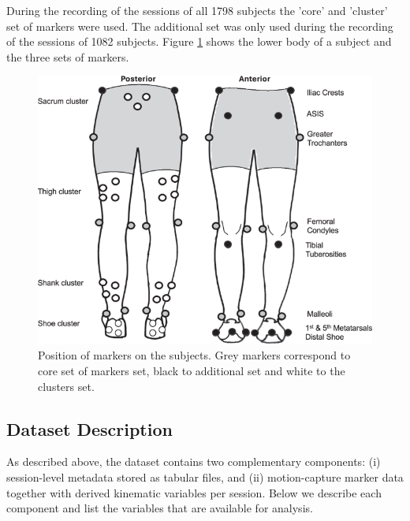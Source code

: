 During the recording of the sessions of all 1798 subjects the 'core' and 'cluster' set of markers were used. The additional set was only used during the recording of the sessions of 1082 subjects. Figure \ref{fig:marker_position} shows the lower body of a subject and the three sets of markers.

\begin{figure}[ht]
    \begin{centering}
    \includegraphics[width=0.5\columnwidth]{images/billateral_marker_position.png}
    \par\end{centering}
    \caption{Position of markers on the subjects. Grey markers correspond to core set of markers set, black to additional set and white to the clusters set.}
    \label{fig:marker_position}
\end{figure}


\subsection{Dataset Description}\label{subsec:method-dataset-description}
As described above, the dataset contains two complementary components: (i) session-level metadata stored as tabular files, and (ii) motion-capture marker data together with derived kinematic variables per session. Below we describe each component and list the variables that are available for analysis.

